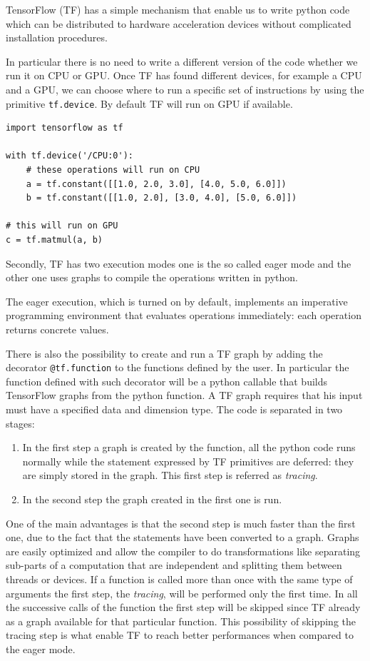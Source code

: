 \documentclass[../main/main.tex]{subfiles}
\begin{document}
TensorFlow (TF) has a simple mechanism that enable us to write python code which can be distributed to hardware 
 acceleration devices without complicated installation procedures.
 
 In particular there is no need to write a different version of the code whether we run it on CPU or GPU. Once TF has found different devices, for example a CPU and a GPU, we can choose where to run a specific set of instructions by using the primitive \texttt{tf.device}.
 By default TF will run on GPU if available.
 
\begin{verbatim}
import tensorflow as tf

with tf.device('/CPU:0'):
	# these operations will run on CPU
	a = tf.constant([[1.0, 2.0, 3.0], [4.0, 5.0, 6.0]])
	b = tf.constant([[1.0, 2.0], [3.0, 4.0], [5.0, 6.0]])
		
# this will run on GPU	
c = tf.matmul(a, b)
\end{verbatim}

Secondly, TF has two execution modes one is the so called eager mode and the other one uses graphs to compile the operations written in python.

The eager execution, which is turned on by default, implements an imperative programming environment that evaluates operations immediately: each operation returns concrete values. 

There is also the possibility to create and run a  TF graph by adding the decorator \texttt{@tf.function} to the functions defined by the user. In particular the function defined with such decorator will be a python callable that builds TensorFlow graphs from the python function.
A TF graph requires that his input must have a specified data and dimension type. The code is separated in two stages:
\begin{enumerate}
	\item In the first step a graph is created by the function, all the python code runs normally while the statement expressed by TF primitives are deferred: they are simply stored in the graph. This first step is referred as \emph{tracing}.
	\item In the second step the graph created in the first one is run.
\end{enumerate}

One of the main advantages is that the second step is much faster than the first one, due to the fact that the statements have been converted to a graph. 
Graphs are easily optimized and allow the compiler to do transformations like separating sub-parts of a computation that are independent and splitting them between threads or devices.
If a function is called more than once with the same type of arguments the first step, the \emph{tracing}, will be performed only the first time. In all the successive calls of the function the first step will be skipped since TF already as a graph available for that particular function.
This possibility of skipping the tracing step is what enable TF to reach better performances when compared to the eager mode. 
\end{document}
